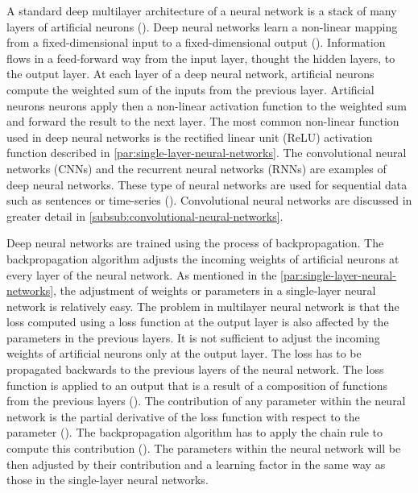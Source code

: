 \documentclass{BachelorBUI}
\begin{document}
                A standard deep multilayer architecture of a neural network is a stack of many layers of artificial neurons (\cite{LeCun:2015}). Deep neural networks learn a non-linear mapping from a fixed-dimensional input to a fixed-dimensional output (\cite{LeCun:2015}). Information flows in a feed-forward way from the input layer, thought the hidden layers, to the output layer. At each layer of a deep neural network, artificial neurons compute the weighted sum of the inputs from the previous layer. Artificial neurons neurons apply then a non-linear activation function to the weighted sum and forward the result to the next layer. The most common non-linear function used in deep neural networks is the rectified linear unit (ReLU) activation function described in \autoref{par:single-layer-neural-networks}. The convolutional neural networks (CNNs) and the recurrent neural networks (RNNs) are examples of deep neural networks. These type of neural networks are used for sequential data such as sentences or time-series (\cite{Aggarwal:2018}). Convolutional neural networks are discussed in greater detail in \autoref{subsub:convolutional-neural-networks}.
                
                Deep neural networks are trained using the process of backpropagation. The backpropagation algorithm adjusts the incoming weights of artificial neurons at every layer of the neural network. As mentioned in the \autoref{par:single-layer-neural-networks}, the adjustment of weights or parameters in a single-layer neural network is relatively easy. The problem in multilayer neural network is that the loss computed using a loss function at the output layer is also affected by the parameters in the previous layers. It is not sufficient to adjust the incoming weights of artificial neurons only at the output layer. The loss has to be propagated backwards to the previous layers of the neural network. The loss function is applied to an output that is a result of a composition of functions from the previous layers (\cite{Bishop:2024}). The contribution of any parameter within the neural network is the partial derivative of the loss function with respect to the parameter (\cite{Bishop:2024}). The backpropagation algorithm has to apply the chain rule to compute this contribution (\cite{Aggarwal:2018}). The parameters within the neural network will be then adjusted by their contribution and a learning factor in the same way as those in the single-layer neural networks.
\end{document}
